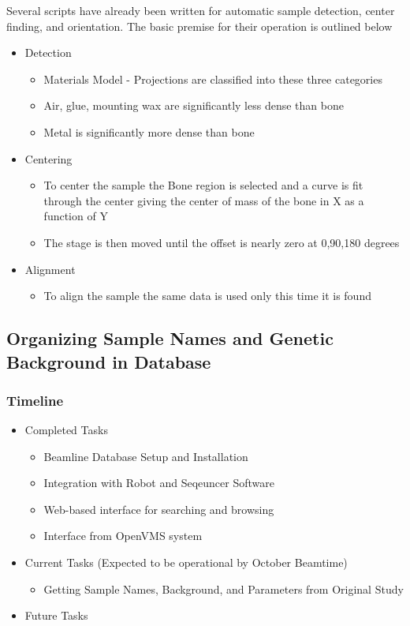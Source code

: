 Several scripts have already been written for automatic sample detection, center finding, and orientation. The basic premise for their operation is outlined below
\begin{itemize}
 	\item Detection 
	\begin{itemize}
		\item Materials Model - Projections are classified into these three categories
		\item Air, glue, mounting wax are significantly less dense than bone
		\item Metal is significantly more dense than bone
	\end{itemize}
	\item Centering
	\begin{itemize}
		\item To center the sample the Bone region is selected and a curve is fit through the center giving the center of mass of the bone in X as a function of Y
		\item The stage is then moved until the offset is nearly  zero at 0,90,180 degrees
	\end{itemize}
	\item Alignment
	\begin{itemize}
		\item To align the sample the same data is used only this time it is found
	\end{itemize}
\end{itemize}


\subsection{Organizing Sample Names and Genetic Background in Database}
\subsubsection*{Timeline}
\begin{itemize}
 	\item Completed Tasks
	\begin{itemize}
		\item Beamline Database Setup and Installation
		\item Integration with Robot and Seqeuncer Software
		\item Web-based interface for searching and browsing
		\item Interface from OpenVMS system
	\end{itemize}
	\item Current Tasks (Expected to be operational by October Beamtime)
	\begin{itemize}
		\item Getting Sample Names, Background, and Parameters from Original Study
	\end{itemize}
	\item Future Tasks
\end{itemize}
